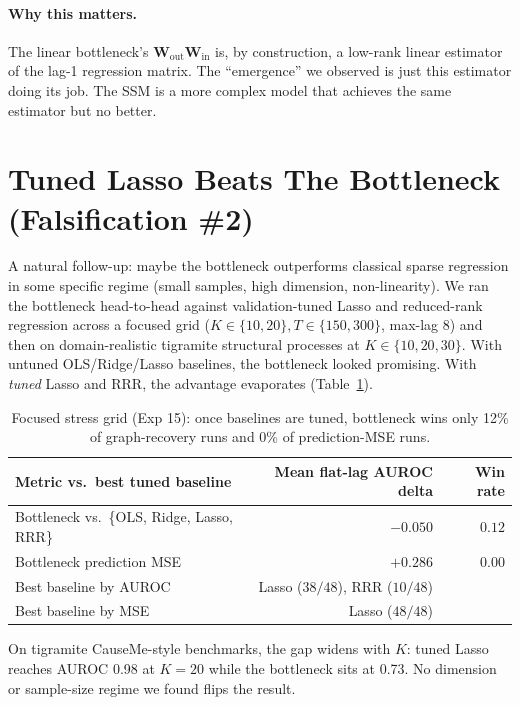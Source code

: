\documentclass{article}
\begin{document}
\paragraph{Why this matters.} The linear bottleneck's
$\mathbf{W}_{\text{out}} \mathbf{W}_{\text{in}}$ is, by construction,
a low-rank linear estimator of the lag-1 regression matrix. The
``emergence'' we observed is just this estimator doing its job. The
SSM is a more complex model that achieves the same estimator but no
better.

\section{Tuned Lasso Beats The Bottleneck (Falsification \#2)}
\label{sec:lasso}

A natural follow-up: maybe the bottleneck outperforms classical
sparse regression in some specific regime (small samples, high
dimension, non-linearity). We ran the bottleneck head-to-head against
validation-tuned Lasso and reduced-rank regression across a focused
grid ($K \in \{10, 20\}, T \in \{150, 300\}$, max-lag 8) and then on
domain-realistic tigramite structural processes at $K \in \{10, 20,
30\}$. With untuned OLS/Ridge/Lasso baselines, the bottleneck looked
promising. With \emph{tuned} Lasso and RRR, the advantage evaporates
(Table~\ref{tab:lasso}).

\begin{table}[t]
\centering
\small
\caption{Focused stress grid (Exp 15): once baselines are tuned,
bottleneck wins only 12\% of graph-recovery runs and 0\% of
prediction-MSE runs.}
\label{tab:lasso}
\begin{tabular}{lrr}
\toprule
Metric vs.\ best tuned baseline & Mean flat-lag AUROC delta & Win rate \\
\midrule
Bottleneck vs.\ \{OLS, Ridge, Lasso, RRR\} & $-0.050$ & $0.12$ \\
Bottleneck prediction MSE & $+0.286$ & $0.00$ \\
\midrule
Best baseline by AUROC & Lasso ($38/48$), RRR ($10/48$) & \\
Best baseline by MSE & Lasso ($48/48$) & \\
\bottomrule
\end{tabular}
\end{table}

On tigramite CauseMe-style benchmarks, the gap widens with $K$:
tuned Lasso reaches AUROC 0.98 at $K=20$ while the bottleneck sits at
0.73. No dimension or sample-size regime we found flips the result.
\end{document}
